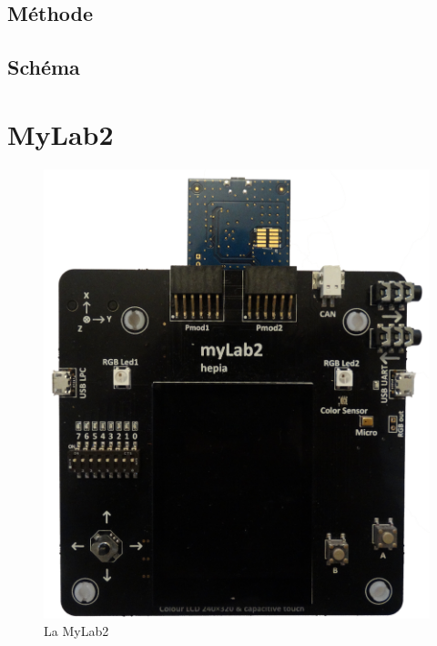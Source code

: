 \documentclass[a4paper]{article}
\begin{document}

\subsection{Méthode}


\subsection{Schéma}

\newpage

\section{MyLab2}

\begin{figure}[!h]
  \centering
  \includegraphics[scale=0.3]{images/mylab2.png}
  \caption{La MyLab2}
\end{figure}
\end{document}
